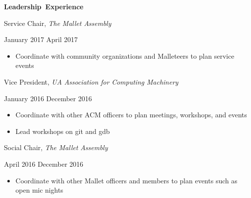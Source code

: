 \documentclass[11pt]{article}
\begin{document}
\vspace{0.8em}
\hbox{\large \textbf{Leadership Experience}}

\vspace{0.4em}
\begin{minipage}[t]{0.65\textwidth}
\flushleft
Service Chair, \textit{The Mallet Assembly}\\
\end{minipage}
\begin{minipage}[t]{0.30\textwidth}
\flushright
January 2017 \space \textemdash \space April 2017\\
\end{minipage}

\begin{itemize}
  \item Coordinate with community organizations and Malleteers to plan service events
\end{itemize}

\vspace{0.4em}
\begin{minipage}[t]{0.65\textwidth}
\flushleft
Vice President, \textit{UA Association for Computing Machinery}\\
\end{minipage}
\begin{minipage}[t]{0.30\textwidth}
\flushright
January 2016 \space \textemdash \space December 2016\\
\end{minipage}

\begin{itemize}
  \item Coordinate with other ACM officers to plan meetings, workshops, and events
  \item Lead workshops on git and gdb
\end{itemize}

\vspace{0.4em}
\begin{minipage}[t]{0.65\textwidth}
\flushleft
Social Chair, \textit{The Mallet Assembly}\\
\end{minipage}
\begin{minipage}[t]{0.30\textwidth}
\flushright
April 2016 \space \textemdash \space December 2016\\
\end{minipage}

\begin{itemize}
  \item Coordinate with other Mallet officers and members to plan events such as open mic nights
\end{itemize}
\end{document}
